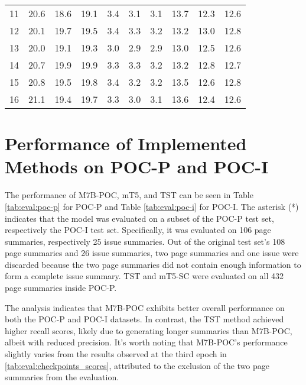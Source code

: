 \documentclass[english, ba, kiv, he, iso690numb, pdf, viewonly]{fasthesis}
\begin{document}
\begin{table}[ht]
\begin{tabular}{
        l
        S
        S
        S
        S
        S
        S
        S
        S
        S
    }
        11 & 20.6 & 18.6 & 19.1 & 3.4 & 3.1 & 3.1 & 13.7 & 12.3 & 12.6 \\
        12 & 20.1 & 19.7 & 19.5 & 3.4 & 3.3 & 3.2 & 13.2 & 13.0 & 12.8 \\
        13 & 20.0 & 19.1 & 19.3 & 3.0 & 2.9 & 2.9 & 13.0 & 12.5 & 12.6 \\
        14 & 20.7 & 19.9 & 19.9 & 3.3 & 3.3 & 3.2 & 13.2 & 12.8 & 12.7 \\
        15 & 20.8 & 19.5 & 19.8 & 3.4 & 3.2 & 3.2 & 13.5 & 12.6 & 12.8 \\
        16 & 21.1 & 19.4 & 19.7 & 3.3 & 3.0 & 3.1 & 13.6 & 12.4 & 12.6 \\
        \bottomrule
    \end{tabular}
\end{table}


\section{Performance of Implemented Methods on POC-P and POC-I}\label{eval:res_poc}
The performance of M7B-POC, mT5, and TST can be seen in Table \ref{tab:eval:poc-p} for POC-P and Table \ref{tab:eval:poc-i} for POC-I. The asterisk (*) indicates that the model was evaluated on a subset of the POC-P test set, respectively the POC-I test set. Specifically, it was evaluated on 106 page summaries, respectively 25 issue summaries. Out of the original test set's 108 page summaries and 26 issue summaries, two page summaries and one issue were discarded because the two page summaries did not contain enough information to form a complete issue summary. TST and mT5-SC were evaluated on all 432 page summaries inside POC-P.

The analysis indicates that M7B-POC exhibits better overall performance on both the POC-P and POC-I datasets. In contrast, the TST method achieved higher recall scores, likely due to generating longer summaries than M7B-POC, albeit with reduced precision. It's worth noting that M7B-POC's performance slightly varies from the results observed at the third epoch in \ref{tab:eval:checkpoints_scores}, attributed to the exclusion of the two page summaries from the evaluation.
\end{document}
